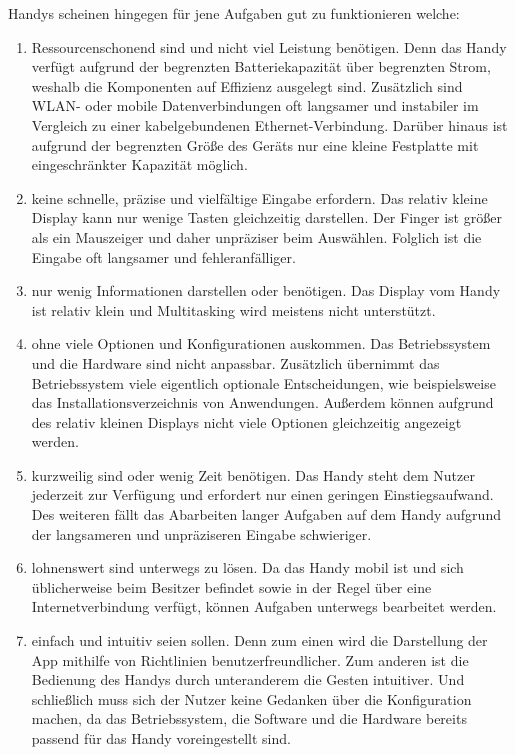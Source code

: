 %
\myNewSection
Handys scheinen hingegen für jene Aufgaben gut zu funktionieren welche: %
\begin{enumerate}
	\item Ressourcenschonend sind und nicht viel Leistung benötigen.\newline%
	Denn das Handy verfügt aufgrund der begrenzten Batteriekapazität über begrenzten Strom, weshalb die Komponenten auf Effizienz ausgelegt sind. Zusätzlich sind WLAN- oder mobile Datenverbindungen oft langsamer und instabiler im Vergleich zu einer kabelgebundenen Ethernet-Verbindung. Darüber hinaus ist aufgrund der begrenzten Größe des Geräts nur eine kleine Festplatte mit eingeschränkter Kapazität möglich.%
	\item keine schnelle, präzise und vielfältige Eingabe erfordern.\newline%
	Das relativ kleine Display kann nur wenige Tasten gleichzeitig darstellen. Der Finger ist größer als ein Mauszeiger und daher unpräziser beim Auswählen. Folglich ist die Eingabe oft langsamer und fehleranfälliger.%
	\item nur wenig Informationen darstellen oder benötigen.\newline%
	Das Display vom Handy ist relativ klein und Multitasking wird meistens nicht unterstützt.%
	\item ohne viele Optionen und Konfigurationen auskommen.\newline%
	Das Betriebssystem und die Hardware sind nicht anpassbar. Zusätzlich übernimmt das Betriebssystem viele eigentlich optionale Entscheidungen, wie beispielsweise das Installationsverzeichnis von Anwendungen. Außerdem können aufgrund des relativ kleinen Displays nicht viele Optionen gleichzeitig angezeigt werden.%
	\item kurzweilig sind oder wenig Zeit benötigen.\newline%
	Das Handy steht dem Nutzer jederzeit zur Verfügung und erfordert nur einen geringen Einstiegsaufwand. Des weiteren fällt das Abarbeiten langer Aufgaben auf dem Handy aufgrund der langsameren und unpräziseren Eingabe schwieriger.%
	\item lohnenswert sind unterwegs zu lösen.\newline%
	Da das Handy mobil ist und sich üblicherweise beim Besitzer befindet sowie in der Regel über eine Internetverbindung verfügt, können Aufgaben unterwegs bearbeitet werden.%
	\item einfach und intuitiv seien sollen.\newline%
	Denn zum einen wird die Darstellung der App mithilfe von Richtlinien benutzerfreundlicher. Zum anderen ist die Bedienung des Handys durch unteranderem die Gesten intuitiver. Und schließlich muss sich der Nutzer keine Gedanken über die Konfiguration machen, da das Betriebssystem, die Software und die Hardware bereits passend für das Handy voreingestellt sind.%
\end{enumerate}

